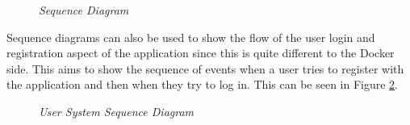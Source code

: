 \begin{figure}[!ht]
\centering
{}
\caption{\em Sequence Diagram}
\label{fig:sequence_diagram}
\end{figure}

\newpage
Sequence diagrams can also be used to show the flow of the user login and registration aspect of the application since this is quite different to the Docker side. This aims to show the sequence of events when a user tries to register with the application and then when they try to log in. This can be seen in Figure \ref{fig:user_sequence_diagram}.

\begin{figure}[!ht]
\centering
{}
\caption{\em User System Sequence Diagram}
\label{fig:user_sequence_diagram}
\end{figure}

